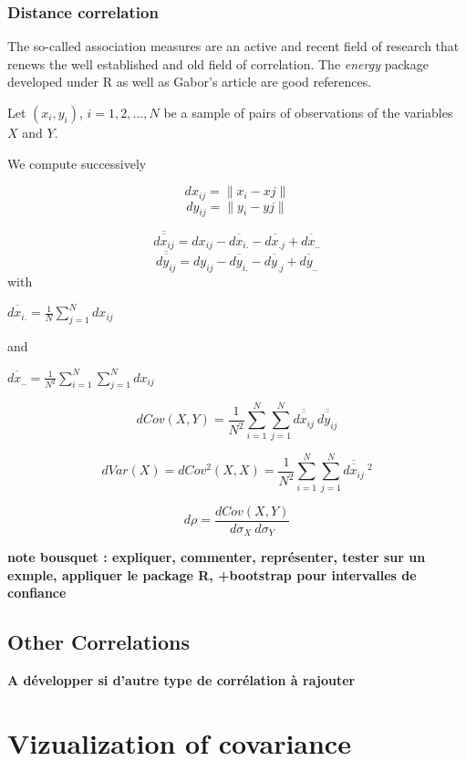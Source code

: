 \documentclass[
]{report}
\begin{document}
\hypertarget{distance-correlation}{%
\subsection{Distance correlation}\label{distance-correlation}}

The so-called association measures are an active and recent field of research that renews the well established and old field of correlation. The \emph{energy} package developed under R as well as Gabor's article \citep{discor} are good references.

Let \((x_i,y_i)\), \(i=1,2, \dots, N\) be a sample of pairs of observations of the variables \(X\) and \(Y\).

We compute successively

\[dx_{ij}=\lVert x_i-xj \rVert\]
\[dy_{ij}=\lVert y_i-yj \rVert\]

\[\overline{\overline{dx_{ij}}}=dx_{ij}-\overline{dx_{i.}}-\overline{dx_{.j}}+\overline{dx_{..}}\]
\[\overline{\overline{dy_{ij}}}=dy_{ij}-\overline{dy_{i.}}-\overline{dy_{.j}}+\overline{dy_{..}}\]
with

\(\overline{dx_{i.}}=\frac{1}{N}\sum_{j=1}^{N} dx_{ij}\)

and

\(\overline{dx_{..}}=\frac{1}{N^2}\sum_{i=1}^{N}\sum_{j=1}^{N} dx_{ij}\)

\[dCov(X,Y)=\frac{1}{N^2}\sum_{i=1}^{N}\sum_{j=1}^{N}
\overline{\overline{dx_{ij}}}~ 
\overline{\overline{dy_{ij}}}\]

\[dVar(X)=dCov^2(X,X)=\frac{1}{N^2}\sum_{i=1}^{N}\sum_{j=1}^{N} 
\overline{\overline{dx_{ij}}}~^2\]

\[d\rho=\frac{dCov(X,Y)}{d\sigma_X~d\sigma_Y}\]

\textbf{note bousquet : expliquer, commenter, représenter, tester sur un exmple, appliquer le package R, +bootstrap pour intervalles de confiance}

\hypertarget{other-correlations}{%
\section{Other Correlations}\label{other-correlations}}

\textbf{A développer si d'autre type de corrélation à rajouter}

\hypertarget{vizualization-of-covariance}{%
\chapter{Vizualization of covariance}\label{vizualization-of-covariance}}
\end{document}
